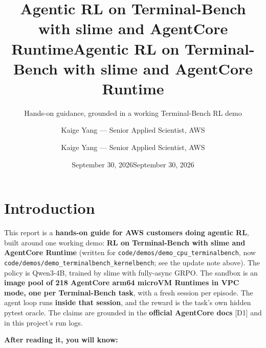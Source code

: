 \documentclass[
  paper=a4,
  ,captions=tableheading
]{scrartcl}
\title{Agentic RL on Terminal-Bench with slime and AgentCore Runtime}
\subtitle{Hands-on guidance, grounded in a working Terminal-Bench RL
demo}
\author{Kaige Yang --- Senior Applied Scientist, AWS}
\date{September 30, 2026}
\title{Agentic RL on Terminal-Bench with slime and AgentCore Runtime}
\author{Kaige Yang --- Senior Applied Scientist, AWS}
\date{September 30, 2026}
\begin{document}
\begin{titlepage}
\newcommand{\colorRule}[3][black]{\textcolor[HTML]{#1}{\rule{#2}{#3}}}
\end{titlepage}
\restoregeometry
{}



{
\setcounter{tocdepth}{3}
\tableofcontents
\newpage
}
\hypertarget{introduction}{%
\section{Introduction}\label{introduction}}

This report is a \textbf{hands-on guide for AWS customers doing agentic
RL}, built around one working demo: \textbf{RL on Terminal-Bench with
slime and AgentCore Runtime} (written for
\texttt{code/demos/demo\_cpu\_terminalbench}, now
\texttt{code/demos/demo\_terminalbench\_kernelbench}; see the update
note above). The policy is Qwen3-4B, trained by slime with fully-async
GRPO. The sandbox is an \textbf{image pool of 218 AgentCore arm64
microVM Runtimes in VPC mode, one per Terminal-Bench task}, with a fresh
session per episode. The agent loop runs \textbf{inside that session},
and the reward is the task's own hidden pytest oracle. The claims are
grounded in the \textbf{official AgentCore docs} {[}D1{]} and in this
project's run logs.

\textbf{After reading it, you will know:}
\end{document}

